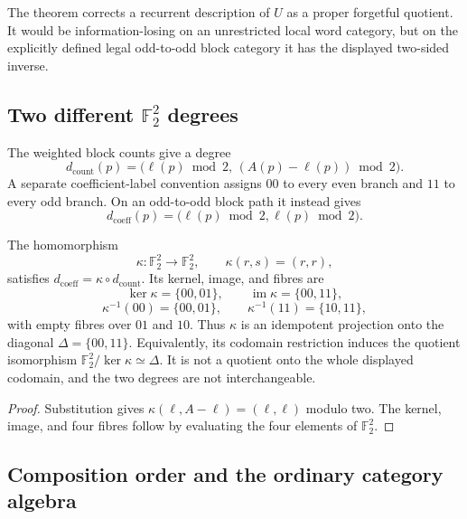 The theorem corrects a recurrent description of $U$ as a proper forgetful
quotient.  It would be information-losing on an unrestricted local word
category, but on the explicitly defined legal odd-to-odd block category it
has the displayed two-sided inverse.

\subsection{Two different \texorpdfstring{$\mathbb F_2^2$}{F2-squared} degrees}

The weighted block counts give a degree
\[
 d_{\mathrm{count}}(p)
 =\bigl(\ell(p)\bmod2,\,(A(p)-\ell(p))\bmod2\bigr).
\]
A separate coefficient-label convention assigns $00$ to every even branch
and $11$ to every odd branch.  On an odd-to-odd block path it instead gives
\[
 d_{\mathrm{coeff}}(p)
   =\bigl(\ell(p)\bmod2,\ell(p)\bmod2\bigr).
\]

\begin{proposition}
\label{prop:chatnotes-two-path-gradings}
The homomorphism
\[
 \kappa:\mathbb F_2^2\longrightarrow\mathbb F_2^2,
 \qquad \kappa(r,s)=(r,r),
\]
satisfies $d_{\mathrm{coeff}}=\kappa\circ d_{\mathrm{count}}$.  Its kernel,
image, and fibres are
\[
 \ker\kappa=\{00,01\},
 \qquad \operatorname{im}\kappa=\{00,11\},
\]
\[
 \kappa^{-1}(00)=\{00,01\},
 \qquad
 \kappa^{-1}(11)=\{10,11\},
\]
with empty fibres over $01$ and $10$.  Thus $\kappa$ is an idempotent
projection onto the diagonal $\Delta=\{00,11\}$.  Equivalently, its codomain
restriction induces the quotient isomorphism
$\mathbb F_2^2/\ker\kappa\simeq\Delta$.  It is not a quotient onto the whole
displayed codomain, and the two degrees are not interchangeable.
\end{proposition}

\begin{proof}
Substitution gives
$\kappa(\ell,A-\ell)=(\ell,\ell)$ modulo two.  The kernel, image, and four
fibres follow by evaluating the four elements of $\mathbb F_2^2$.
\end{proof}

\subsection{Composition order and the ordinary category algebra}

